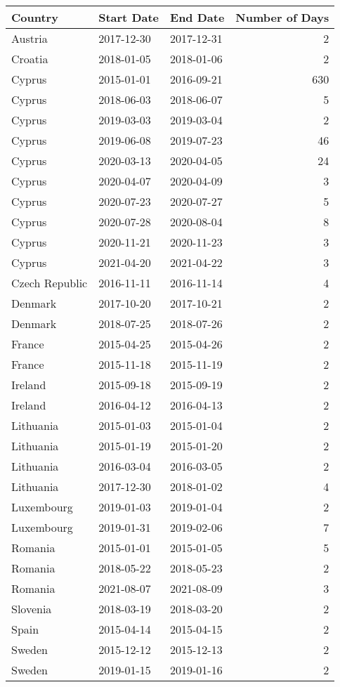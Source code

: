 \begin{tabular}{lllr}
\toprule
Country & Start Date & End Date & Number of Days \\
\midrule
Austria & 2017-12-30 & 2017-12-31 & 2 \\
Croatia & 2018-01-05 & 2018-01-06 & 2 \\
Cyprus & 2015-01-01 & 2016-09-21 & 630 \\
Cyprus & 2018-06-03 & 2018-06-07 & 5 \\
Cyprus & 2019-03-03 & 2019-03-04 & 2 \\
Cyprus & 2019-06-08 & 2019-07-23 & 46 \\
Cyprus & 2020-03-13 & 2020-04-05 & 24 \\
Cyprus & 2020-04-07 & 2020-04-09 & 3 \\
Cyprus & 2020-07-23 & 2020-07-27 & 5 \\
Cyprus & 2020-07-28 & 2020-08-04 & 8 \\
Cyprus & 2020-11-21 & 2020-11-23 & 3 \\
Cyprus & 2021-04-20 & 2021-04-22 & 3 \\
Czech Republic & 2016-11-11 & 2016-11-14 & 4 \\
Denmark & 2017-10-20 & 2017-10-21 & 2 \\
Denmark & 2018-07-25 & 2018-07-26 & 2 \\
France & 2015-04-25 & 2015-04-26 & 2 \\
France & 2015-11-18 & 2015-11-19 & 2 \\
Ireland & 2015-09-18 & 2015-09-19 & 2 \\
Ireland & 2016-04-12 & 2016-04-13 & 2 \\
Lithuania & 2015-01-03 & 2015-01-04 & 2 \\
Lithuania & 2015-01-19 & 2015-01-20 & 2 \\
Lithuania & 2016-03-04 & 2016-03-05 & 2 \\
Lithuania & 2017-12-30 & 2018-01-02 & 4 \\
Luxembourg & 2019-01-03 & 2019-01-04 & 2 \\
Luxembourg & 2019-01-31 & 2019-02-06 & 7 \\
Romania & 2015-01-01 & 2015-01-05 & 5 \\
Romania & 2018-05-22 & 2018-05-23 & 2 \\
Romania & 2021-08-07 & 2021-08-09 & 3 \\
Slovenia & 2018-03-19 & 2018-03-20 & 2 \\
Spain & 2015-04-14 & 2015-04-15 & 2 \\
Sweden & 2015-12-12 & 2015-12-13 & 2 \\
Sweden & 2019-01-15 & 2019-01-16 & 2 \\
\bottomrule
\end{tabular}
